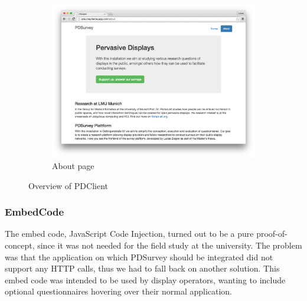 \begin{figure}
		    \begin{subfigure}[b]{0.6\textwidth}
		        \centering
		        \includegraphics[width=\textwidth]{img/screenshots/pdclient/about}
		        \caption{About page}
		        \label{fig:4-pdclient-about}
		    \end{subfigure}
		    \caption{Overview of PDClient}
		    \label{fig:pdclient-screenshots}
		\end{figure}



	\subsubsection{EmbedCode}

		The embed code, JavaScript Code Injection, turned out to be a pure proof-of-concept, since it was not needed for the field study at the university. The problem was that the application on which PDSurvey should be integrated did not support any HTTP calls, thus we had to fall back on another solution. This embed code was intended to be used by display operators, wanting to include optional questionnaires hovering over their normal application. 



